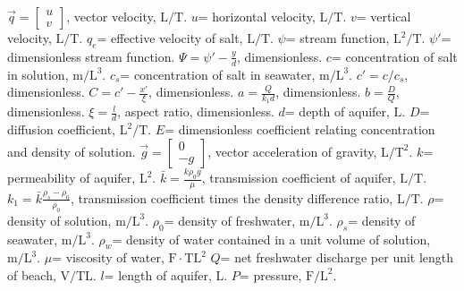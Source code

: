 \begin{table}
  \begin{tabular}
    $\vec{q}=\begin{bmatrix}u \\ v \end{bmatrix}$, vector velocity, $\text{L}/\text{T}$.
    $u$= horizontal velocity, $\text{L}/\text{T}$.
    $v$= vertical velocity, $\text{L}/\text{T}$.
    $q_{e}$= effective velocity of salt, $\text{L}/\text{T}$.
    $\psi $= stream function, $\text{L}^{2}/\text{T}$.
    $\psi'$= dimensionless stream function.
    $\Psi=\psi'-\frac{y}{d}$, dimensionless.
    $c$= concentration of salt in solution, $\text{m}/\text{L}^3$.
    $c_s$= concentration of salt in seawater, $\text{m}/\text{L}^3$.
    $c'=c/c_s$, dimensionless.
    $C=c'-\frac{x'}{\xi}$, dimensionless.
    $a=\frac{Q}{k_1 d}$, dimensionless.
    $b=\frac{D}{Q}$, dimensionless.
    $\xi =\frac{l}{d}$, aspect ratio, dimensionless.
    $d$= depth of aquifer, $\text{L}$.
    $D$= diffusion coefficient, $\text{L}^2/\text{T}$.
    $E$= dimensionless coefficient relating concentration and density of solution.
    $\vec{g}=\begin{bmatrix} 0 \\ -g \end{bmatrix}$, vector acceleration of gravity, $\text{L}/\text{T}^2$.
    $k$= permeability of aquifer, $\text{L}^2$.
    $\bar{k}=\frac{k \rho_0 g}{\mu}$, transmission coefficient of aquifer, $\text{L}/\text{T}$.
    $k_{1} =\bar{k} \frac{\rho_s -\rho_0}{\rho_0}$, transmission coefficient times the density difference ratio, $\text{L}/\text{T}$.
    $\rho$= density of solution, $\text{m}/\text{L}^3$.
    $\rho _{0} $= density of freshwater, $\text{m}/\text{L}^3$.
    $\rho _{s} $= density of seawater, $\text{m}/\text{L}^3$.
    $\rho _{w} $= density of water contained in a unit volume of solution, $\text{m}/\text{L}^3$.
    $\mu $= viscosity of water, $\text{F} \cdot \text{T}\text{L}^2$
    $Q$= net freshwater discharge per unit length of beach, $\text{V}/\text{TL}$.
    $l$= length of aquifer, $ \text{L} $.
    $P$= pressure, $\text{F}/\text{L}^2$.
  \end{tabular}
  \caption{Variables}
  \label{tab:Variable}
\end{table}

